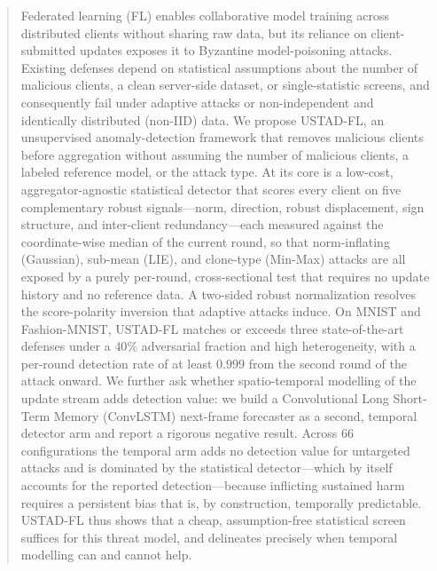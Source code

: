 \documentclass[journal]{IEEEtran}
\begin{document}
\begin{abstract}
Federated learning (FL) enables collaborative model training across distributed clients without sharing raw data, but its reliance on client-submitted updates exposes it to Byzantine model-poisoning attacks. Existing defenses depend on statistical assumptions about the number of malicious clients, a clean server-side dataset, or single-statistic screens, and consequently fail under adaptive attacks or non-independent and identically distributed (non-IID) data. We propose USTAD-FL, an unsupervised anomaly-detection framework that removes malicious clients before aggregation without assuming the number of malicious clients, a labeled reference model, or the attack type. At its core is a low-cost, aggregator-agnostic statistical detector that scores every client on five complementary robust signals---norm, direction, robust displacement, sign structure, and inter-client redundancy---each measured against the coordinate-wise median of the current round, so that norm-inflating (Gaussian), sub-mean (LIE), and clone-type (Min-Max) attacks are all exposed by a purely per-round, cross-sectional test that requires no update history and no reference data. A two-sided robust normalization resolves the score-polarity inversion that adaptive attacks induce. On MNIST and Fashion-MNIST, USTAD-FL matches or exceeds three state-of-the-art defenses under a $40\%$ adversarial fraction and high heterogeneity, with a per-round detection rate of at least $0.999$ from the second round of the attack onward. We further ask whether spatio-temporal modelling of the update stream adds detection value: we build a Convolutional Long Short-Term Memory (ConvLSTM) next-frame forecaster as a second, temporal detector arm and report a rigorous negative result. Across $66$ configurations the temporal arm adds no detection value for untargeted attacks and is dominated by the statistical detector---which by itself accounts for the reported detection---because inflicting sustained harm requires a persistent bias that is, by construction, temporally predictable. USTAD-FL thus shows that a cheap, assumption-free statistical screen suffices for this threat model, and delineates precisely when temporal modelling can and cannot help.
\end{abstract}
\end{document}

